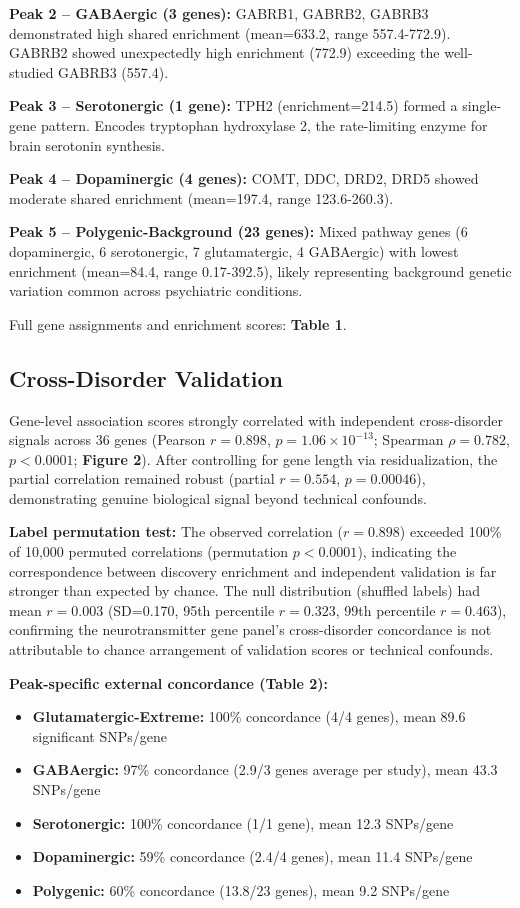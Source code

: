 \documentclass[12pt,letterpaper]{article}
\theoremstyle{definition}
\theoremstyle{remark}
\begin{document}
\textbf{Peak 2 -- GABAergic (3 genes):} GABRB1, GABRB2, GABRB3 demonstrated high shared enrichment (mean=633.2, range 557.4-772.9). GABRB2 showed unexpectedly high enrichment (772.9) exceeding the well-studied GABRB3 (557.4).

\textbf{Peak 3 -- Serotonergic (1 gene):} TPH2 (enrichment=214.5) formed a single-gene pattern. Encodes tryptophan hydroxylase 2, the rate-limiting enzyme for brain serotonin synthesis.

\textbf{Peak 4 -- Dopaminergic (4 genes):} COMT, DDC, DRD2, DRD5 showed moderate shared enrichment (mean=197.4, range 123.6-260.3).

\textbf{Peak 5 -- Polygenic-Background (23 genes):} Mixed pathway genes (6 dopaminergic, 6 serotonergic, 7 glutamatergic, 4 GABAergic) with lowest enrichment (mean=84.4, range 0.17-392.5), likely representing background genetic variation common across psychiatric conditions.

Full gene assignments and enrichment scores: \textbf{Table 1}.

\subsection{Cross-Disorder Validation}

Gene-level association scores strongly correlated with independent cross-disorder signals across 36 genes (Pearson $r=0.898$, $p=1.06 \times 10^{-13}$; Spearman $\rho=0.782$, $p<0.0001$; \textbf{Figure 2}). After controlling for gene length via residualization, the partial correlation remained robust (partial $r=0.554$, $p=0.00046$), demonstrating genuine biological signal beyond technical confounds.

\textbf{Label permutation test:} The observed correlation ($r=0.898$) exceeded 100\% of 10,000 permuted correlations (permutation $p<0.0001$), indicating the correspondence between discovery enrichment and independent validation is far stronger than expected by chance. The null distribution (shuffled labels) had mean $r=0.003$ (SD=0.170, 95th percentile $r=0.323$, 99th percentile $r=0.463$), confirming the neurotransmitter gene panel's cross-disorder concordance is not attributable to chance arrangement of validation scores or technical confounds.

\textbf{Peak-specific external concordance (\textbf{Table 2}):}
\begin{itemize}
    \item \textbf{Glutamatergic-Extreme:} 100\% concordance (4/4 genes), mean 89.6 significant SNPs/gene
    \item \textbf{GABAergic:} 97\% concordance (2.9/3 genes average per study), mean 43.3 SNPs/gene
    \item \textbf{Serotonergic:} 100\% concordance (1/1 gene), mean 12.3 SNPs/gene
    \item \textbf{Dopaminergic:} 59\% concordance (2.4/4 genes), mean 11.4 SNPs/gene
    \item \textbf{Polygenic:} 60\% concordance (13.8/23 genes), mean 9.2 SNPs/gene
\end{itemize}
\end{document}
